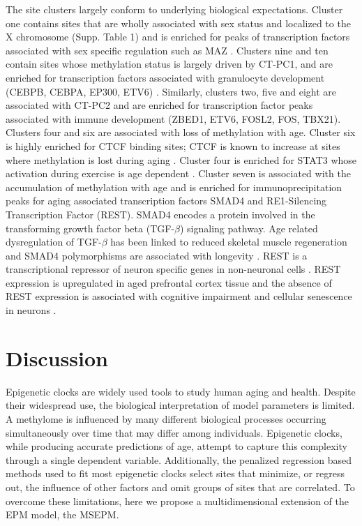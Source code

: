 \documentclass{article}
\begin{document}
{\begin{linenumbers}
The site clusters largely conform to underlying biological expectations. Cluster one contains sites that are wholly 
associated with sex status and localized to the X chromosome (Supp. Table 1) and is enriched for peaks of 
transcription factors associated with sex specific regulation such as MAZ \cite{Lopes-Ramos2020-ex}. Clusters nine and 
ten contain sites whose methylation status is largely driven by CT-PC1, and are enriched for transcription factors 
associated with granulocyte development (CEBPB, CEBPA, EP300, ETV6)\cite{Theilgaard-Monch2022-zw} \cite{Guerzoni2006-ii}.  
Similarly, clusters two, five and eight are associated with CT-PC2 and are enriched for transcription factor peaks 
associated with immune development (ZBED1, ETV6, FOSL2, FOS, TBX21). Clusters four and six are associated with loss of 
methylation with age. Cluster six is highly enriched for CTCF binding sites; CTCF is known to increase at sites where 
methylation is lost during aging \cite{Tharakan2020-pj}. Cluster four is enriched for STAT3 whose activation during 
exercise is age dependent \cite{Trenerry2008-kj,Mohamed2020-he}.  Cluster seven is associated with the accumulation 
of methylation with age and is enriched for immunoprecipitation peaks for aging associated transcription factors 
SMAD4 and RE1-Silencing Transcription Factor (REST). SMAD4 encodes a protein involved in the transforming growth 
factor beta (TGF-$\beta$) signaling pathway. Age related dysregulation of TGF-$\beta$ has been linked to reduced skeletal muscle 
regeneration\cite{Paris2016-fo,Carlson2009-uz} and SMAD4 polymorphisms are associated 
with longevity \cite{Carrieri2004-by}. REST is a transcriptional repressor of neuron specific genes in non-neuronal 
cells \cite{Chong1995-dj,Coulson2005-pb}. REST expression is upregulated in aged prefrontal cortex tissue and the 
absence of REST expression is associated with cognitive impairment \cite{Lu2014-dz} and 
cellular senescence in neurons \cite{Rocchi2021-od}.


\section{Discussion}

Epigenetic clocks are widely used tools to study human aging and health. Despite their widespread use, the 
biological interpretation of model parameters is limited. A methylome is influenced by many different biological 
processes occurring simultaneously over time that may differ among individuals. Epigenetic clocks, while producing 
accurate predictions of age, attempt to capture this complexity through a single dependent variable. Additionally, 
the penalized regression based methods used to fit most epigenetic clocks select sites that minimize, or regress out,
the influence of other factors and omit groups of sites that are correlated. To overcome these limitations, here we 
propose a multidimensional extension of the EPM model, the MSEPM. 


\end{linenumbers}}
\end{document}
